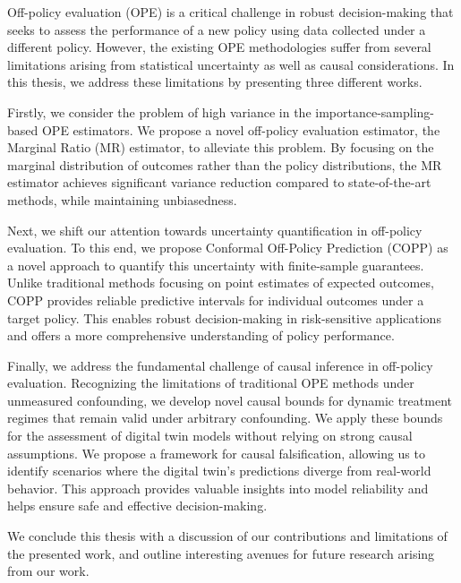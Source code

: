 Off-policy evaluation (OPE) is a critical challenge in robust decision-making that seeks to assess the performance of a new policy using data collected under a different policy. 
However, the existing OPE methodologies suffer from several limitations arising from statistical uncertainty as well as causal considerations. 
In this thesis, we address these limitations by presenting three different works. 

Firstly, we consider the problem of high variance in the importance-sampling-based OPE estimators. 
We propose a novel off-policy evaluation estimator, the Marginal Ratio (MR) estimator, to alleviate this problem.
By focusing on the marginal distribution of outcomes rather than the policy distributions, the MR estimator achieves significant variance reduction compared to state-of-the-art methods, while maintaining unbiasedness. 

Next, we shift our attention towards uncertainty quantification in off-policy evaluation.
To this end, we propose Conformal Off-Policy Prediction (COPP) as a novel approach to quantify this uncertainty with finite-sample guarantees.
Unlike traditional methods focusing on point estimates of expected outcomes, COPP provides reliable predictive intervals for individual outcomes under a target policy. This enables robust decision-making in risk-sensitive applications and offers a more comprehensive understanding of policy performance. 

Finally, we address the fundamental challenge of causal inference in off-policy evaluation. 
Recognizing the limitations of traditional OPE methods under unmeasured confounding, we develop novel causal bounds for dynamic treatment regimes that remain valid under arbitrary confounding.
We apply these bounds for the assessment of digital twin models without relying on strong causal assumptions. 
We propose a framework for causal falsification, allowing us to identify scenarios where the digital twin's predictions diverge from real-world behavior. This approach provides valuable insights into model reliability and helps ensure safe and effective decision-making.

We conclude this thesis with a discussion of our contributions and
limitations of the presented work, and outline interesting avenues for future research arising from our work.